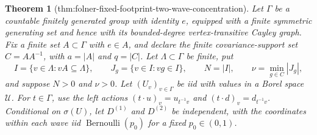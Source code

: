 \documentclass{article}
\newtheorem{theorem}{Theorem}
\begin{document}
\begin{theorem}[thm:folner-fixed-footprint-two-wave-concentration]\label{thm:folner-fixed-footprint-two-wave-concentration}
Let \(\Gamma\) be a countable finitely generated group with identity \(e\), equipped with a finite symmetric generating set and hence with its bounded-degree vertex-transitive Cayley graph.  Fix a finite set \(A\subset\Gamma\) with \(e\in A\), and declare the finite covariance-support set \(C=AA^{-1}\), with \(a=|A|\) and \(q=|C|\).  Let \(\Lambda\subset\Gamma\) be finite, put
\[
 I=\{v\in\Lambda:vA\subseteq\Lambda\},\qquad
 J_g=\{v\in I:vg\in I\},\qquad
 N=|I|,\qquad \nu=\min_{g\in C}|J_g|,
\]
and suppose \(N>0\) and \(\nu>0\).  Let \((U_v)_{v\in\Gamma}\) be iid with values in a Borel space \(\mathcal U\).  For \(t\in\Gamma\), use the left actions \((t\cdot u)_v=u_{t^{-1}v}\) and \((t\cdot d)_v=d_{t^{-1}v}\).  Conditional on \(\sigma(U)\), let \(D^{(1)}\) and \(D^{(2)}\) be independent, with the coordinates within each wave iid \(\operatorname{Bernoulli}(p_0)\) for a fixed \(p_0\in(0,1)\).


\end{theorem}
\end{document}
